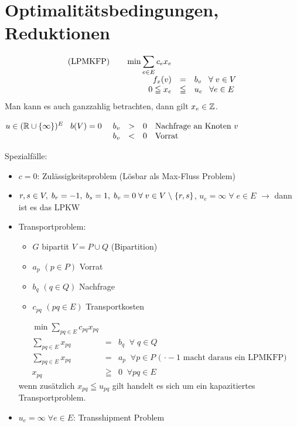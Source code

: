 
\section{Optimalitätsbedingungen, Reduktionen}


\[\begin{array}{rcl}
(\mbox{LPMKFP}) \hspace{7mm} \min \displaystyle \sum_{e \in E} c_{e} x_{e}\\
f_{x}(v) & = & b_{v} \; \; \; \forall \; v \in V\\
0 \leqq x_{e} &\leqq& u_{e} \; \; \; \forall e \in E
\end{array}\]
Man kann es auch ganzzahlig betrachten, dann gilt $x_{e} \in \mathbb{Z}$. 

$u \in (\mathbb{R} \cup \{\infty\})^{E} \hspace{3mm} b(V) = 0 \hspace{3mm}
\begin{array}[t]{rcll}b_{v} &>& 0 & \mbox{Nachfrage an Knoten $v$}\\
b_{v} &<& 0 & \mbox{Vorrat}\end{array}$

Spezialfälle:
\begin{itemize}
\item $c=0$: Zulässigkeitsproblem (Lösbar als Max-Fluss Problem)
\item $r,s \in V, \; b_{r}=-1, \; b_{s} = 1, \; b_{v} = 0 \; \forall \; v
\in V \;\backslash\; \{r,s\}$, $ u_{e} = \infty \; \forall \; e \in E$ $\rightarrow$
dann ist es das LPKW
\item Transportproblem:\begin{itemize}
\item $G$ bipartit $V = P \cup Q$ (Bipartition)
\item $a_{p}$ $(p \in P)$ Vorrat
\item $b_{q}$ $(q \in Q)$ Nachfrage
\item $c_{p q}$ $(p q \in E)$  Transportkosten
\end{itemize}
\[\begin{array}{rcl}
\min \displaystyle \sum_{p q \in E} c_{p q} x_{p q}\\
\displaystyle \sum_{p q \in E} x_{p q} &=& b_{q} \; \; \forall \; q \in Q\\
\displaystyle \sum_{p q \in E} x_{p q} &=& a_{p} \; \; \forall p \in P
\mbox{ ( $\cdot -1$ macht daraus ein LPMKFP)}\\
x_{p q} &\geqq& 0 \; \; \forall p q \in E
\end{array}
\]
wenn zusätzlich $x_{p q} \leqq u_{p q}$ gilt handelt es sich um ein
kapazitiertes Transportproblem.
\item $u_{e} = \infty \; \forall e \in E$: Transshipment Problem
\end{itemize}

